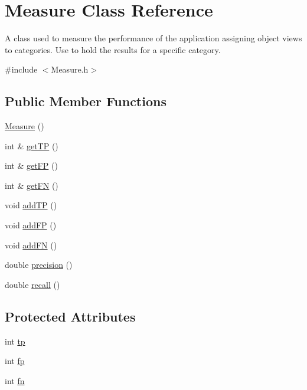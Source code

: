 \hypertarget{class_measure}{}\section{Measure Class Reference}
\label{class_measure}


A class used to measure the performance of the application assigning object views to categories. Use to hold the results for a specific category.  




{\ttfamily \#include $<$Measure.\+h$>$}

\subsection*{Public Member Functions}
\begin{DoxyCompactItemize}
\item 
\hyperlink{class_measure_ab55c93d6121f43c91a337fb7bcd26825}{Measure} ()
\item 
int \& \hyperlink{class_measure_a28c4d8877916c477d2e3003d3f467ca2}{get\+TP} ()
\item 
int \& \hyperlink{class_measure_a68c038fe576017b5d3ce00895dc0aeb5}{get\+FP} ()
\item 
int \& \hyperlink{class_measure_a9b2213f1dd9fd63e64629ecbb8ecce35}{get\+FN} ()
\item 
void \hyperlink{class_measure_a163284f13b6b79ba19f7db571365c7e1}{add\+TP} ()
\item 
void \hyperlink{class_measure_ae3b5b1f8db1a660dd55495bcc69d2a3d}{add\+FP} ()
\item 
void \hyperlink{class_measure_adfac0ce9647ed61b6fdfa6c81b1e5971}{add\+FN} ()
\item 
double \hyperlink{class_measure_a2cac1a29c5ae012b810499be8d301753}{precision} ()
\item 
double \hyperlink{class_measure_afb7cbc9872452a8ce1f78e6f0661daa0}{recall} ()
\end{DoxyCompactItemize}
\subsection*{Protected Attributes}
\begin{DoxyCompactItemize}
\item 
int \hyperlink{class_measure_a88e0c0f67850429f30650a2b7e7076aa}{tp}
\item 
int \hyperlink{class_measure_a2f4b9fd7379fc019a8dd276f316eddd7}{fp}
\item 
int \hyperlink{class_measure_ac0e820e813b633be8aa145f415aa81eb}{fn}
\end{DoxyCompactItemize}


